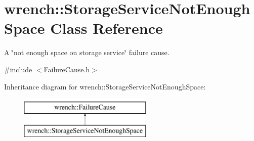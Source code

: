 \hypertarget{classwrench_1_1_storage_service_not_enough_space}{}\section{wrench\+:\+:Storage\+Service\+Not\+Enough\+Space Class Reference}
\label{classwrench_1_1_storage_service_not_enough_space}


A \char`\"{}not enough space on storage service\char`\"{} failure cause.  




{\ttfamily \#include $<$Failure\+Cause.\+h$>$}

Inheritance diagram for wrench\+:\+:Storage\+Service\+Not\+Enough\+Space\+:\begin{figure}[H]
\begin{center}
\leavevmode
\includegraphics[height=2.000000cm]{classwrench_1_1_storage_service_not_enough_space}
\end{center}
\end{figure}
